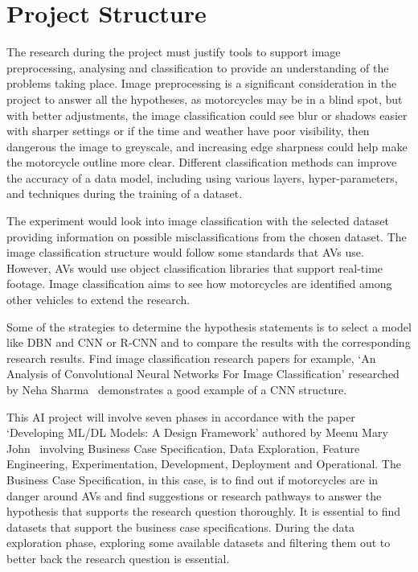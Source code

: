 \documentclass[12pt]{report} %
\begin{document}
	\section{Project Structure}
        The research during the project must justify tools to support image preprocessing, analysing and classification to provide an understanding of the problems taking place. Image preprocessing is a significant consideration in the project to answer all the hypotheses, as motorcycles may be in a blind spot, but with better adjustments, the image classification could see blur or shadows easier with sharper settings or if the time and weather have poor visibility, then dangerous the image to greyscale, and increasing edge sharpness could help make the motorcycle outline more clear. Different classification methods can improve the accuracy of a data model, including using various layers, hyper-parameters, and techniques during the training of a dataset.

        The experiment would look into image classification with the selected dataset providing information on possible misclassifications from the chosen dataset. The image classification structure would follow some standards that AVs use. However, AVs would use object classification libraries that support real-time footage. Image classification aims to see how motorcycles are identified among other vehicles to extend the research.

        Some of the strategies to determine the hypothesis statements is to select a model like DBN and CNN or R-CNN and to compare the results with the corresponding research results. Find image classification research papers for example, `An Analysis of Convolutional Neural Networks For Image Classification' researched by Neha Sharma~\cite{sharma_analysis_2018} demonstrates a good example of a CNN structure. 

        This AI project will involve seven phases in accordance with the paper `Developing ML/DL Models: A Design Framework' authored by Meenu Mary John~\cite{john_developing_2020} involving Business Case Specification, Data Exploration, Feature Engineering, Experimentation, Development, Deployment and Operational. The Business Case Specification, in this case, is to find out if motorcycles are in danger around AVs and find suggestions or research pathways to answer the hypothesis that supports the research question thoroughly. It is essential to find datasets that support the business case specifications. During the data exploration phase, exploring some available datasets and filtering them out to better back the research question is essential. 
        
\end{document}
